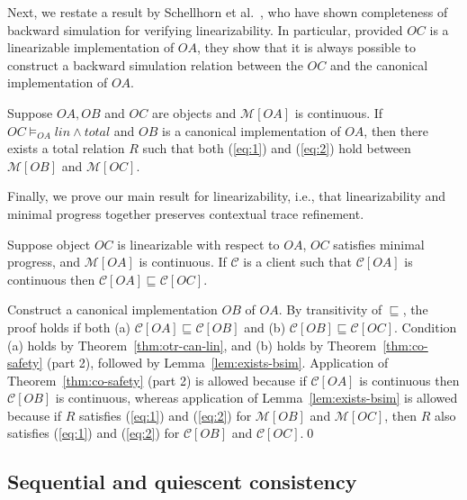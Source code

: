 \documentclass[11pt]{llncs}
\def \sref  {\sqsubseteq}
\newcommand{\mcC}{\mathcal{C}}
\newcommand{\mcM}{\mathcal{M}}
\newcommand{\MGC}{\mathcal{M}}
\newcommand{\refeqn}[1]{(\ref{#1})}
\newcommand{\refthm}[1]{Theorem~\ref{#1}}
\newcommand{\reflem}[1]{Lem\-ma~\ref{#1}}
\begin{document}
Next, we restate a result by Schellhorn et al.\ \cite{SDW14}, who have
shown completeness of backward simulation for verifying
linearizability. In particular, provided $OC$ is a linearizable
implementation of $OA$, they show that it is always possible to
construct a backward simulation relation between the $OC$ and the
canonical implementation of $OA$.
\begin{lemma}
  \label{lem:exists-bsim}
  Suppose $OA, OB$ and $OC$ are objects and $\MGC[OA]$ is
  continuous. If $OC \models_{OA} lin \land total$ and $OB$ is a
  canonical implementation of $OA$, then there exists a total relation
  $R$ such that both \refeqn{eq:1} and \refeqn{eq:2} hold between
  $\MGC[OB]$ and $\MGC[OC]$.
\end{lemma}


Finally, we prove our main result for linearizability, i.e., that
linearizability and minimal progress together preserves contextual
trace refinement.\begin{theorem}
  \label{thm:otr-lin}
  Suppose object $OC$ is linearizable with respect to $OA$, $OC$
  satisfies minimal progress, and $\mcM[OA]$ is continuous. If $\mcC$
  is a client such that $\mcC[OA]$ is continuous then
  $\mcC[OA] \sref \mcC[OC]$.
\end{theorem}



Construct a canonical implementation $OB$ of $OA$. By transitivity of
$\sref$, the proof holds if both (a) $\mcC[OA] \sref \mcC[OB]$ and (b)
$\mcC[OB] \sref \mcC[OC]$.  Condition (a) holds by
\refthm{thm:otr-can-lin}, and (b) holds by \refthm{thm:co-safety}
(part 2), followed by \reflem{lem:exists-bsim}. Application of
\refthm{thm:co-safety} (part 2) is allowed because if $\mcC[OA]$ is
continuous then $\mcC[OB]$ is continuous, whereas application of
\reflem{lem:exists-bsim} is allowed because if $R$ satisfies
\refeqn{eq:1} and \refeqn{eq:2} for $\MGC[OB]$ and $\MGC[OC]$, then
$R$ also satisfies \refeqn{eq:1} and \refeqn{eq:2} for $\mcC[OB]$ and
$\mcC[OC]$.\hfill \qed



\vspace{-1mm}



\subsection{Sequential and quiescent consistency}
\label{sec:link-corr-cont}
\end{document}
